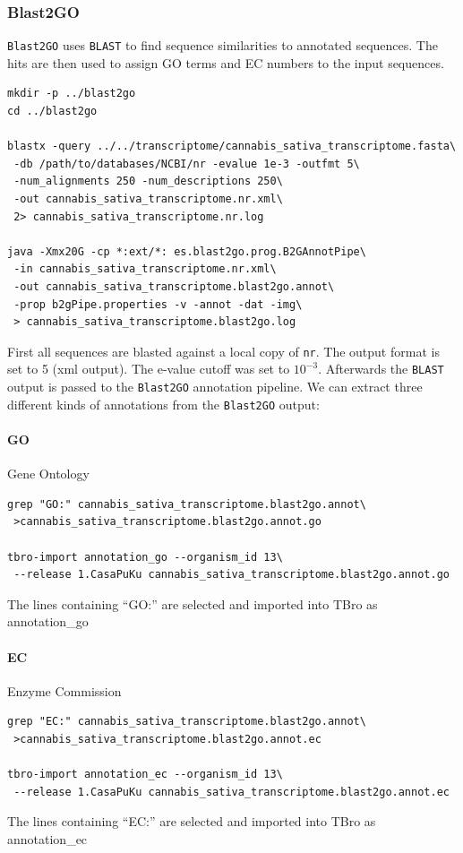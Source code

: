 \documentclass[english]{scrartcl}
\begin{document}
\subsubsection{Blast2GO}
\texttt{Blast2GO} uses \texttt{BLAST} to find sequence similarities to annotated
sequences. The hits are then used to assign GO terms and EC numbers to the input
sequences.
\begin{lstlisting}
mkdir -p ../blast2go
cd ../blast2go

blastx -query ../../transcriptome/cannabis_sativa_transcriptome.fasta\ 
 -db /path/to/databases/NCBI/nr -evalue 1e-3 -outfmt 5\ 
 -num_alignments 250 -num_descriptions 250\
 -out cannabis_sativa_transcriptome.nr.xml\
 2> cannabis_sativa_transcriptome.nr.log

java -Xmx20G -cp *:ext/*: es.blast2go.prog.B2GAnnotPipe\
 -in cannabis_sativa_transcriptome.nr.xml\
 -out cannabis_sativa_transcriptome.blast2go.annot\
 -prop b2gPipe.properties -v -annot -dat -img\
 > cannabis_sativa_transcriptome.blast2go.log
\end{lstlisting}
First all sequences are blasted against a local copy of \texttt{nr}. The output
format is set to 5 (xml output). The e-value cutoff was set to $10^{-3}$.
Afterwards the \texttt{BLAST} output is passed to the \texttt{Blast2GO} annotation
pipeline.
We can extract three different kinds of annotations from the \texttt{Blast2GO}
output:

\paragraph{GO}
Gene Ontology
\begin{lstlisting}
grep "GO:" cannabis_sativa_transcriptome.blast2go.annot\
 >cannabis_sativa_transcriptome.blast2go.annot.go

tbro-import annotation_go --organism_id 13\
 --release 1.CasaPuKu cannabis_sativa_transcriptome.blast2go.annot.go
\end{lstlisting}
The lines containing ``GO:'' are selected and imported into TBro as
annotation\_go

\paragraph{EC}
Enzyme Commission
\begin{lstlisting}
grep "EC:" cannabis_sativa_transcriptome.blast2go.annot\
 >cannabis_sativa_transcriptome.blast2go.annot.ec

tbro-import annotation_ec --organism_id 13\
 --release 1.CasaPuKu cannabis_sativa_transcriptome.blast2go.annot.ec
\end{lstlisting}
The lines containing ``EC:'' are selected and imported into TBro as
annotation\_ec
\end{document}
